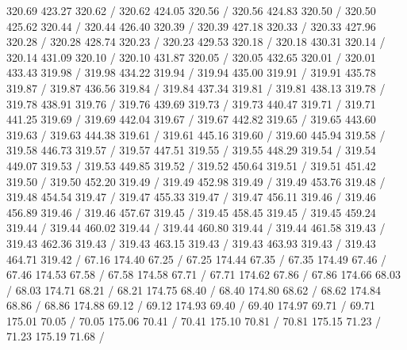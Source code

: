 { 320.69 423.27 320.62 /
 320.62 424.05 320.56 /
 320.56 424.83 320.50 /
 320.50 425.62 320.44 /
 320.44 426.40 320.39 /
 320.39 427.18 320.33 /
 320.33 427.96 320.28 /
 320.28 428.74 320.23 /
 320.23 429.53 320.18 /
 320.18 430.31 320.14 /
 320.14 431.09 320.10 /
 320.10 431.87 320.05 /
 320.05 432.65 320.01 /
 320.01 433.43 319.98 /
 319.98 434.22 319.94 /
 319.94 435.00 319.91 /
 319.91 435.78 319.87 /
 319.87 436.56 319.84 /
 319.84 437.34 319.81 /
 319.81 438.13 319.78 /
 319.78 438.91 319.76 /
 319.76 439.69 319.73 /
 319.73 440.47 319.71 /
 319.71 441.25 319.69 /
 319.69 442.04 319.67 /
 319.67 442.82 319.65 /
 319.65 443.60 319.63 /
 319.63 444.38 319.61 /
 319.61 445.16 319.60 /
 319.60 445.94 319.58 /
 319.58 446.73 319.57 /
 319.57 447.51 319.55 /
 319.55 448.29 319.54 /
 319.54 449.07 319.53 /
 319.53 449.85 319.52 /
 319.52 450.64 319.51 /
 319.51 451.42 319.50 /
 319.50 452.20 319.49 /
 319.49 452.98 319.49 /
 319.49 453.76 319.48 /
 319.48 454.54 319.47 /
 319.47 455.33 319.47 /
 319.47 456.11 319.46 /
 319.46 456.89 319.46 /
 319.46 457.67 319.45 /
 319.45 458.45 319.45 /
 319.45 459.24 319.44 /
 319.44 460.02 319.44 /
 319.44 460.80 319.44 /
 319.44 461.58 319.43 /
 319.43 462.36 319.43 /
 319.43 463.15 319.43 /
 319.43 463.93 319.43 /
 319.43 464.71 319.42 /
\setsolid
{} 67.16 174.40 67.25 /
 67.25 174.44 67.35 /
 67.35 174.49 67.46 /
 67.46 174.53 67.58 /
 67.58 174.58 67.71 /
 67.71 174.62 67.86 /
 67.86 174.66 68.03 /
 68.03 174.71 68.21 /
 68.21 174.75 68.40 /
 68.40 174.80 68.62 /
 68.62 174.84 68.86 /
 68.86 174.88 69.12 /
 69.12 174.93 69.40 /
 69.40 174.97 69.71 /
 69.71 175.01 70.05 /
 70.05 175.06 70.41 /
 70.41 175.10 70.81 /
 70.81 175.15 71.23 /
 71.23 175.19 71.68 /
}
